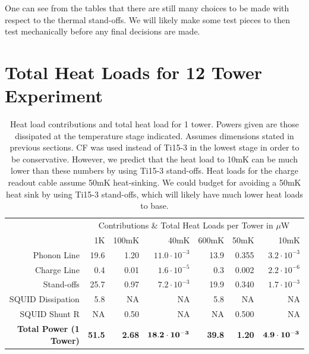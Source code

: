 \documentclass{article}
\begin{document}
One can see from the tables that there are still many choices to be made with respect to the thermal stand-offs. We will likely make some test pieces to then test mechanically before any final decisions are made.

\newpage
\section{Total Heat Loads for 12 Tower Experiment}
\begin{table}[h]
\begin{threeparttable}
\begin{tabular}{rrrr|rrr}
\toprule
 & \multicolumn{6}{c}{Contributions \& Total Heat Loads per Tower in $\mu$W} \\
  & 1K & 100mK & 40mK & 600mK & 50mK & 10mK \\
 \cmidrule(r){2-7}
   Phonon Line & 19.6 & 1.20 & $11.0 \cdot 10^{-3}$  & 13.9 & 0.355 & $3.2 \cdot 10^{-3}$ \\
   Charge Line & 0.4 & 0.01 & $1.6 \cdot 10^{-5} $ & 0.3 & 0.002  & $2.2 \cdot 10^{-6}$ \\
   Stand-offs & 25.7 & 0.97 & $7.2 \cdot 10^{-3}$ & 19.9 & 0.340 & $1.7 \cdot 10^{-3}$ \\
   SQUID Dissipation & 5.8 & NA & NA & 5.8 & NA & NA \\
   SQUID Shunt R & NA & 0.50 & NA & NA & 0.500 & NA \\
   \bf{Total Power (1 Tower)} & \bf{51.5} & \bf{2.68} & $ \bf{18.2 \cdot 10^{-3}}$ & \bf{39.8} & \bf{1.20} & $\bf{4.9 \cdot 10^{-3}}$ \\
  \bottomrule
\end{tabular}
\end{threeparttable}
\caption{Heat load contributions and total heat load for 1 tower. Powers given are those dissipated at the temperature stage indicated. Assumes dimensions stated in previous sections. CF was used instead of Ti15-3 in the lowest stage in order to be conservative. However, we predict that the heat load to 10mK can be much lower than these numbers by using Ti15-3 stand-offs. Heat loads for the charge readout cable assume 50mK heat-sinking. We could budget for avoiding a 50mK heat sink by using Ti15-3 stand-offs, which will likely have much lower heat loads to base. }
\end{table}
\end{document}
